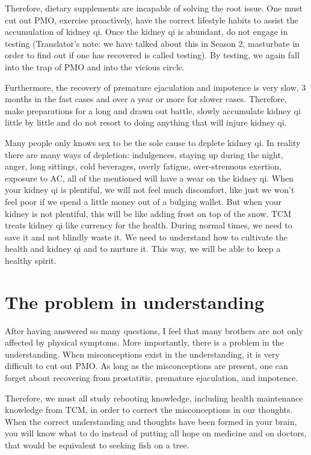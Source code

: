 \documentclass[
]{book}
\begin{document}
Therefore, dietary supplements are incapable of solving the root issue. One must cut out PMO, exercise proactively, have the correct lifestyle habits to assist the accumulation of kidney qi. Once the kidney qi is abundant, do not engage in testing (Translator's note: we have talked about this in Season 2, masturbate in order to find out if one has recovered is called testing). By testing, we again fall into the trap of PMO and into the vicious circle.

Furthermore, the recovery of premature ejaculation and impotence is very slow, 3 months in the fast cases and over a year or more for slower cases. Therefore, make preparations for a long and drawn out battle, slowly accumulate kidney qi little by little and do not resort to doing anything that will injure kidney qi.

Many people only knows sex to be the sole cause to deplete kidney qi. In reality there are many ways of depletion: indulgences, staying up during the night, anger, long sittings, cold beverages, overly fatigue, over-strenuous exertion, exposure to AC, all of the mentioned will have a wear on the kidney qi. When your kidney qi is plentiful, we will not feel much discomfort, like just we won't feel poor if we spend a little money out of a bulging wallet. But when your kidney is not plentiful, this will be like adding frost on top of the snow. TCM treats kidney qi like currency for the health. During normal times, we need to save it and not blindly waste it. We need to understand how to cultivate the health and kidney qi and to nurture it. This way, we will be able to keep a healthy spirit.

\hypertarget{the-problem-in-understanding}{%
\section{The problem in understanding}\label{the-problem-in-understanding}}

After having answered so many questions, I feel that many brothers are not only affected by physical symptoms. More importantly, there is a problem in the understanding. When misconceptions exist in the understanding, it is very difficult to cut out PMO. As long as the misconceptions are present, one can forget about recovering from prostatitis, premature ejaculation, and impotence.

Therefore, we must all study rebooting knowledge, including health maintenance knowledge from TCM, in order to correct the misconceptions in our thoughts. When the correct understanding and thoughts have been formed in your brain, you will know what to do instead of putting all hope on medicine and on doctors, that would be equivalent to seeking fish on a tree.
\end{document}
